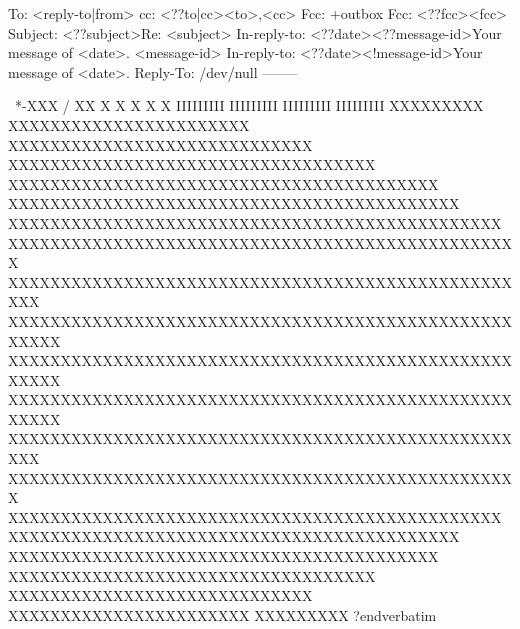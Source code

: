 
\verbatim
To: <reply-to|from>
cc: <??to|cc><to>,<cc>
Fcc: +outbox
Fcc: <??fcc><fcc>
Subject: <??subject>Re: <subject>
In-reply-to: <??date><??message-id>Your message of <date>.
	     <message-id>
In-reply-to: <??date><!message-id>Your message of <date>.
Reply-To: /dev/null
--------

                          \
                         *-XXX
                          /   XX
                                X
                                  X
                                   X
                                   X
                                   X
                               IIIIIIIII
                               IIIIIIIII
                               IIIIIIIII
                               IIIIIIIII
                               XXXXXXXXX
                        XXXXXXXXXXXXXXXXXXXXXXX
                     XXXXXXXXXXXXXXXXXXXXXXXXXXXXX
                  XXXXXXXXXXXXXXXXXXXXXXXXXXXXXXXXXXX
               XXXXXXXXXXXXXXXXXXXXXXXXXXXXXXXXXXXXXXXXX
              XXXXXXXXXXXXXXXXXXXXXXXXXXXXXXXXXXXXXXXXXXX
            XXXXXXXXXXXXXXXXXXXXXXXXXXXXXXXXXXXXXXXXXXXXXXX
           XXXXXXXXXXXXXXXXXXXXXXXXXXXXXXXXXXXXXXXXXXXXXXXXX
          XXXXXXXXXXXXXXXXXXXXXXXXXXXXXXXXXXXXXXXXXXXXXXXXXXX
         XXXXXXXXXXXXXXXXXXXXXXXXXXXXXXXXXXXXXXXXXXXXXXXXXXXXX
         XXXXXXXXXXXXXXXXXXXXXXXXXXXXXXXXXXXXXXXXXXXXXXXXXXXXX
         XXXXXXXXXXXXXXXXXXXXXXXXXXXXXXXXXXXXXXXXXXXXXXXXXXXXX
          XXXXXXXXXXXXXXXXXXXXXXXXXXXXXXXXXXXXXXXXXXXXXXXXXXX
           XXXXXXXXXXXXXXXXXXXXXXXXXXXXXXXXXXXXXXXXXXXXXXXXX
            XXXXXXXXXXXXXXXXXXXXXXXXXXXXXXXXXXXXXXXXXXXXXXX
              XXXXXXXXXXXXXXXXXXXXXXXXXXXXXXXXXXXXXXXXXXX
               XXXXXXXXXXXXXXXXXXXXXXXXXXXXXXXXXXXXXXXXX
                  XXXXXXXXXXXXXXXXXXXXXXXXXXXXXXXXXXX
                     XXXXXXXXXXXXXXXXXXXXXXXXXXXXX
                        XXXXXXXXXXXXXXXXXXXXXXX
                               XXXXXXXXX
?endverbatim

